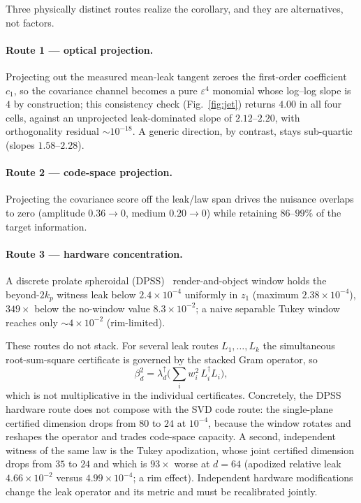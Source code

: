 \documentclass[10pt,twocolumn]{article}
\theoremstyle{plain}
\theoremstyle{definition}
\newcommand{\eps}{\varepsilon}
\newcommand{\bd}{\beta}
\begin{document}
Three physically distinct routes realize the corollary, and they are alternatives,
not factors.

\paragraph{Route 1 --- optical projection.}
Projecting out the measured mean-leak tangent zeroes the first-order coefficient
$c_1$, so the covariance channel becomes a pure $\eps^4$ monomial whose log--log
slope is $4$ by construction; this consistency check (Fig.~\ref{fig:jet}) returns
$4.00$ in all four cells, against an unprojected leak-dominated slope of
$2.12$--$2.20$, with orthogonality residual $\sim10^{-18}$. A generic direction, by
contrast, stays sub-quartic (slopes $1.58$--$2.28$).

\paragraph{Route 2 --- code-space projection.}
Projecting the covariance score off the leak/law span drives the nuisance overlaps
to zero (amplitude $0.36\to0$, medium $0.20\to0$) while retaining $86$--$99\%$ of
the target information.

\paragraph{Route 3 --- hardware concentration.}
A discrete prolate spheroidal (DPSS)~\cite{Slepian} render-and-object window holds the
beyond-$2k_p$ witness leak below $2.4\times10^{-4}$ uniformly in $z_1$ (maximum
$2.38\times10^{-4}$), $349\times$ below the no-window value $8.3\times10^{-2}$; a
naive separable Tukey window reaches only $\sim4\times10^{-2}$ (rim-limited).

These routes do not stack. For several leak routes $L_1,\dots,L_k$ the simultaneous
root-sum-square certificate is governed by the stacked Gram operator, so
\begin{equation}
\bd_d^2=\lambda_d^{\uparrow}\!\Big(\textstyle\sum_i w_i^2\,L_i^\dagger L_i\Big),
\label{eq:noncompose}
\end{equation}
which is not multiplicative in the individual certificates. Concretely, the DPSS
hardware route does not compose with the SVD code route: the single-plane certified
dimension drops from $80$ to $24$ at $10^{-4}$, because the window rotates and
reshapes the operator and trades code-space capacity. A second, independent witness
of the same law is the Tukey apodization, whose joint certified dimension drops from
$35$ to $24$ and which is $93\times$ worse at $d=64$ (apodized relative leak
$4.66\times10^{-2}$ versus $4.99\times10^{-4}$; a rim effect). Independent hardware
modifications change the leak operator and its metric and must be recalibrated
jointly.
\end{document}
